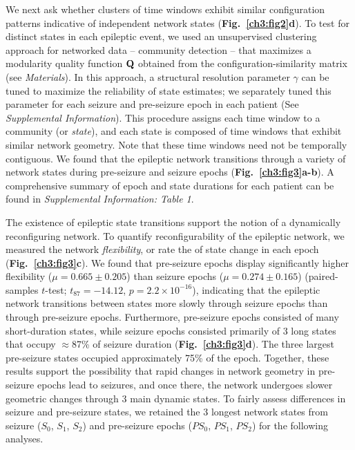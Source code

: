 We next ask whether clusters of time windows exhibit similar configuration patterns indicative of independent network states (\textbf{Fig.~\ref{ch3:fig2}d}). To test for distinct states in each epileptic event, we used an unsupervised clustering approach for networked data -- community detection -- that maximizes a modularity quality function $\mathbf{\displaystyle Q}$ obtained from the configuration-similarity matrix (see \textit{Materials}). In this approach, a structural resolution parameter $\gamma$ can be tuned to maximize the reliability of state estimates; we separately tuned this parameter for each seizure and pre-seizure epoch in each patient (See \textit{Supplemental Information}). This procedure assigns each time window to a community (or \emph{state}), and each state is composed of time windows that exhibit similar network geometry. Note that these time windows need not be temporally contiguous. We found that the epileptic network transitions through a variety of network states during pre-seizure and seizure epochs (\textbf{Fig.~\ref{ch3:fig3}a-b}). A comprehensive summary of epoch and state durations for each patient can be found in \textit{Supplemental Information: Table 1}. 

The existence of epileptic state transitions support the notion of a dynamically reconfiguring network. To quantify reconfigurability of the epileptic network, we measured the network \emph{flexibility}, or rate the of state change in each epoch (\textbf{Fig.~\ref{ch3:fig3}c}). We found that pre-seizure epochs display significantly higher flexibility ($\mu=0.665\pm0.205$) than seizure epochs ($\mu=0.274\pm0.165$) (paired-samples $t$-test; $t_{87}=-14.12$, $p=2.2\times10^{-16}$), indicating that the epileptic network transitions between states more slowly through seizure epochs than through pre-seizure epochs. Furthermore, pre-seizure epochs consisted of many short-duration states, while seizure epochs consisted primarily of 3 long states that occupy $\approx$87\% of seizure duration (\textbf{Fig.~\ref{ch3:fig3}d}). The three largest pre-seizure states occupied approximately 75\% of the epoch. Together, these results support the possibility that rapid changes in network geometry in pre-seizure epochs lead to seizures, and once there, the network undergoes slower geometric changes through 3 main dynamic states. To fairly assess differences in seizure and pre-seizure states, we retained the 3 longest network states from seizure ($S_0$, $S_1$, $S_2$) and pre-seizure epochs ($PS_0$, $PS_1$, $PS_2$) for the following analyses. 

